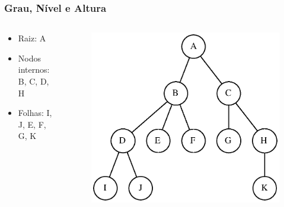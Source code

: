 \documentclass[aspectratio=169]{beamer}
\begin{document}
\begin{frame}\frametitle{Grau, Nível e Altura}
\begin{columns}[T]
\begin{column}{0.4\linewidth}
\begin{itemize}
	\item Raiz: A
	\item Nodos internos: B, C, D, H
	\item Folhas: I, J, E, F, G, K
	\end{itemize}
\end{column}
\begin{column}{0.6\linewidth}
\vspace{-5mm}
\begin{figure}[h]
	\centering
	\includegraphics[height=0.70\paperheight]{imagens/arvore3.eps}
\end{figure}
\end{column}
\end{columns}
\end{frame}
\end{document}

